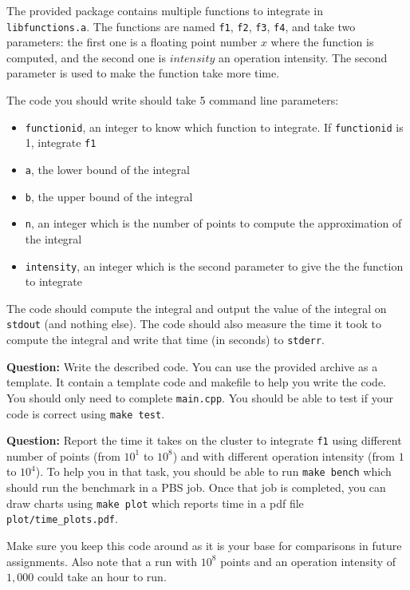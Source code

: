 \documentclass{article}
\newcommand{\question}{{\noindent \bf Question: }}
\begin{document}
The provided package contains multiple functions to integrate in
\texttt{libfunctions.a}. The functions are named \texttt{f1},
\texttt{f2}, \texttt{f3}, \texttt{f4}, and take two parameters: the
first one is a floating point number $x$ where the function is
computed, and the second one is $intensity$ an operation
intensity. The second parameter is used to make the function take more
time.

The code you should write should take 5 command line parameters:
\begin{itemize}
\item \texttt{functionid}, an integer to know which function to integrate. If \texttt{functionid} is 1, integrate \texttt{f1}
\item \texttt{a}, the lower bound of the integral
\item \texttt{b}, the upper bound of the integral
\item \texttt{n}, an integer which is the number of points to compute the approximation of the integral
\item \texttt{intensity}, an integer which is the second parameter to give the the function to integrate
\end{itemize}

The code should compute the integral and output the value of the
integral on \texttt{stdout} (and nothing else). The code should also
measure the time it took to compute the integral and write that time
(in seconds) to \texttt{stderr}.

\question Write the described code. You can use the provided archive
as a template. It contain a template code and makefile to help you
write the code. You should only need to complete
\texttt{main.cpp}. You should be able to test if your code is correct
using \texttt{make test}.

\question Report the time it takes on the cluster to integrate
\texttt{f1} using different number of points (from $10^1$ to $10^8$)
and with different operation intensity (from $1$ to $10^4$). To help
you in that task, you should be able to run \texttt{make bench} which
should run the benchmark in a PBS job. Once that job is completed, you
can draw charts using \texttt{make plot} which reports time in a pdf
file \texttt{plot/time\_plots.pdf}.

Make sure you keep this code around as it is your base for comparisons
in future assignments. Also note that a run with $10^8$ points and an
operation intensity of $1,000$ could take an hour to run.
\end{document}

